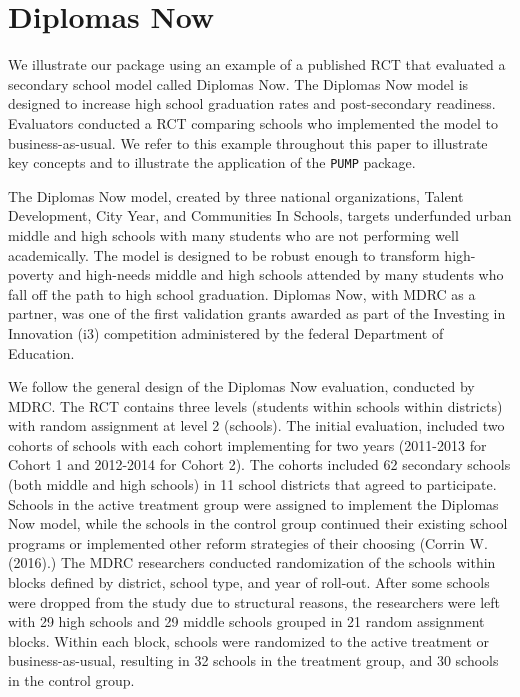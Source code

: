 \documentclass[
]{article}
\begin{document}
\section{Diplomas Now}
\label{sec:diplomas}

We illustrate our package using an example of a published RCT that
evaluated a secondary school model called Diplomas Now. The Diplomas Now
model is designed to increase high school graduation rates and
post-secondary readiness. Evaluators conducted a RCT comparing schools
who implemented the model to business-as-usual. We refer to this example
throughout this paper to illustrate key concepts and to illustrate the
application of the \texttt{PUMP} package.

The Diplomas Now model, created by three national organizations, Talent
Development, City Year, and Communities In Schools, targets underfunded
urban middle and high schools with many students who are not performing
well academically. The model is designed to be robust enough to
transform high-poverty and high-needs middle and high schools attended
by many students who fall off the path to high school graduation.
Diplomas Now, with MDRC as a partner, was one of the first validation
grants awarded as part of the Investing in Innovation (i3) competition
administered by the federal Department of Education.

We follow the general design of the Diplomas Now evaluation, conducted
by MDRC. The RCT contains three levels (students within schools within
districts) with random assignment at level 2 (schools). The initial
evaluation, included two cohorts of schools with each cohort
implementing for two years (2011-2013 for Cohort 1 and 2012-2014 for
Cohort 2). The cohorts included 62 secondary schools (both middle and
high schools) in 11 school districts that agreed to participate. Schools
in the active treatment group were assigned to implement the Diplomas
Now model, while the schools in the control group continued their
existing school programs or implemented other reform strategies of their
choosing (Corrin W. (2016).) The MDRC researchers conducted
randomization of the schools within blocks defined by district, school
type, and year of roll-out. After some schools were dropped from the
study due to structural reasons, the researchers were left with 29 high
schools and 29 middle schools grouped in 21 random assignment blocks.
Within each block, schools were randomized to the active treatment or
business-as-usual, resulting in 32 schools in the treatment group, and
30 schools in the control group.
\end{document}
